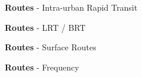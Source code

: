 \documentclass[aspectratio=169]{beamer}
\begin{document}
\begin{frame}
	
	\textbf{Routes} - Intra-urban Rapid Transit 
	
\end{frame}



\begin{frame}
	
	\textbf{Routes} - LRT / BRT
	
\end{frame}



\begin{frame}
	
	\textbf{Routes} - Surface Routes
	
\end{frame}



\begin{frame}
	
	\textbf{Routes} - Frequency
	
\end{frame}
\end{document}

